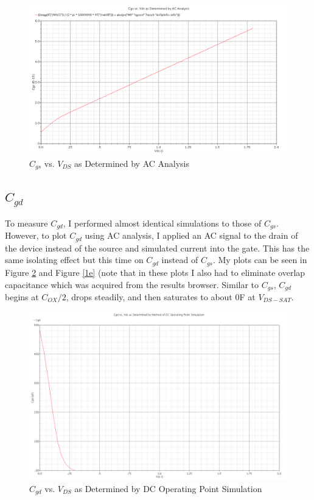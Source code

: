 \documentclass{article}
\begin{document}
\begin{figure}[H]
\centering
\includegraphics[width=5in]{1d.png}
\caption{$C_{gs}$ vs. $V_{DS}$ as Determined by AC Analysis}
\label{1d}
\end{figure}
\newpage

\subsection{$C_{gd}$}
To measure $C_{gd}$, I performed almost identical simulations to those of $C_{gs}$. However, to plot $C_{gd}$ using AC analysis, I applied an AC signal to the drain of the device instead of the source and simulated current into the gate. This has the same isolating effect but this time on $C_{gd}$ instead of $C_{gs}$. My plots can be seen in Figure \ref{1b} and Figure \ref{1e} (note that in these plots I also had to eliminate overlap capacitance which was acquired from the results browser. Similar to $C_{gs}$, $C_{gd}$ begins at $C_{OX}/2$, drops steadily, and then saturates to about 0F at $V_{DS-SAT}$.

\begin{figure}[H]
\centering
\includegraphics[width=5in]{1b.png}
\caption{$C_{gd}$ vs. $V_{DS}$ as Determined by DC Operating Point Simulation}
\label{1b}
\end{figure}
\end{document}
